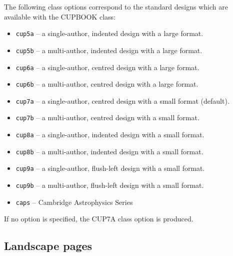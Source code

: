 \documentclass[cup6a]{cupbook}
\begin{document}
The following class options correspond to the standard designs which
are available with the CUPBOOK class:
 \begin{itemize}\listsize
  \item \texttt{cup5a} -- a single-author, indented design with a large format.
  \item \texttt{cup5b} -- a multi-author, indented design with a large format.
  \item \texttt{cup6a} -- a single-author, centred design with a large format.
  \item \texttt{cup6b} -- a multi-author, centred design with a large format.
  \item \texttt{cup7a} -- a single-author, centred design with a small
        format (default).
  \item \texttt{cup7b} -- a multi-author, centred design with a small format.
  \item \texttt{cup8a} -- a single-author, indented design with a small format.
  \item \texttt{cup8b} -- a multi-author, indented design with a small format.
  \item \texttt{cup9a} -- a single-author, flush-left design with a small format.
  \item \texttt{cup9b} -- a multi-author, flush-left design with a small format.
  \item \texttt{caps}  -- Cambridge Astrophysics Series
 \end{itemize}
If no option is specified, the CUP7A class option is produced.

\subsection{Landscape pages}
\label{land}
\end{document}
